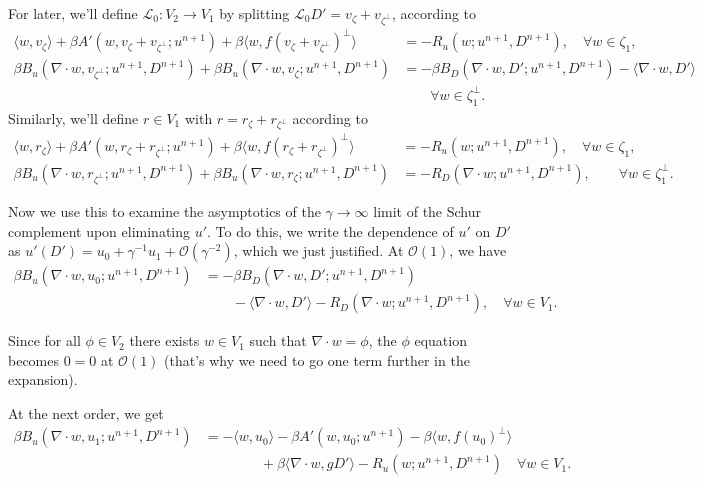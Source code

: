 \documentclass{article}
\begin{document}
For later, we'll define $\mathcal{L}_0:V_2\to V_1$ by splitting
$\mathcal{L}_0D'=v_\zeta + v_{\zeta^\perp}$, according to
\begin{align}
    \langle w, v_\zeta\rangle + \beta A'(w,v_\zeta + v_{\zeta^\perp}; u^{n+1})
  + \beta\langle w, f(v_\zeta + v_{\zeta^\perp})^\perp\rangle &= -R_u(w; u^{n+1},D^{n+1}),
  \quad \forall w\in \zeta_1, \\
  \nonumber
   \beta B_u(\nabla\cdot w, v_{\zeta^\perp}; u^{n+1},D^{n+1})  
  + \beta B_u(\nabla\cdot w, v_\zeta; u^{n+1},D^{n+1}) & = 
  - \beta B_D(\nabla\cdot w, D'; u^{n+1},D^{n+1}) -\langle \nabla\cdot w, D' \rangle \\
  & \qquad \forall w \in \zeta_1^\perp.
\end{align}
Similarly, we'll define $r\in V_1$ with $r=r_\zeta + r_{\zeta^\perp}$ according to
\begin{align}
    \langle w, r_\zeta\rangle + \beta A'(w,r_\zeta + r_{\zeta^\perp}; u^{n+1})
  + \beta\langle w, f(r_\zeta + r_{\zeta^\perp})^\perp\rangle &= -R_u(w; u^{n+1},D^{n+1}),
  \quad \forall w\in \zeta_1, \\
   \beta B_u(\nabla\cdot w, r_{\zeta^\perp}; u^{n+1},D^{n+1})  
  + \beta B_u(\nabla\cdot w, r_\zeta; u^{n+1},D^{n+1}) & = 
-R_D(\nabla\cdot w;u^{n+1},D^{n+1}), \qquad \forall w \in \zeta_1^\perp.
\end{align}

Now we use this to examine the asymptotics of the $\gamma\to \infty$
limit of the Schur complement upon eliminating $u'$. To do this, we
write the dependence of $u'$ on $D'$ as $u'(D') =u_0 + \gamma^{-1} u_1
+ \mathcal{O}(\gamma^{-2})$, which we just justified. At
$\mathcal{O}(1)$, we have
\begin{align}
  \nonumber \beta B_u(\nabla\cdot w, u_0; u^{n+1},D^{n+1}) & = - \beta
  B_D(\nabla\cdot w, D'; u^{n+1},D^{n+1}) \\ & \qquad -\langle
  \nabla\cdot w, D' \rangle -R_D(\nabla\cdot w;u^{n+1},D^{n+1}), \quad
  \forall w\in V_1.
\end{align}

Since for all $\phi\in V_2$ there exists $w\in V_1$ such that
$\nabla\cdot w = \phi$, the $\phi$ equation becomes $0=0$ at
$\mathcal{O}(1)$ (that's why we need to go one term further in the
expansion).

At the next order, we get
\begin{align}
  \nonumber
  \beta B_u(\nabla\cdot w, u_1; u^{n+1},D^{n+1})
  & = 
  -\langle w, u_0 \rangle - \beta A'(w, u_0; u^{n+1})
  - \beta\langle w, f(u_0)^{\perp}\rangle \\
  & \qquad\qquad
  + \beta\langle \nabla\cdot w, gD'\rangle
  -R_u(w;u^{n+1},D^{n+1})
  \quad \forall w \in V_1.
\end{align}
\end{document}
